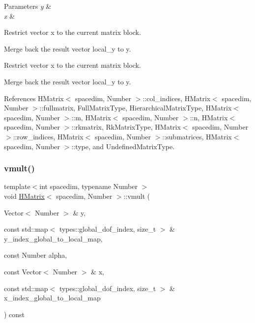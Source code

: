 \begin{DoxyParams}{Parameters}
{\em y} & \\
\hline
{\em x} & \\
\hline
\end{DoxyParams}
Restrict vector x to the current matrix block.

Merge back the result vector {\ttfamily local\+\_\+y} to {\ttfamily y}.

Restrict vector x to the current matrix block.

Merge back the result vector {\ttfamily local\+\_\+y} to {\ttfamily y}.

References H\+Matrix$<$ spacedim, Number $>$\+::col\+\_\+indices, H\+Matrix$<$ spacedim, Number $>$\+::fullmatrix, Full\+Matrix\+Type, Hierarchical\+Matrix\+Type, H\+Matrix$<$ spacedim, Number $>$\+::m, H\+Matrix$<$ spacedim, Number $>$\+::n, H\+Matrix$<$ spacedim, Number $>$\+::rkmatrix, Rk\+Matrix\+Type, H\+Matrix$<$ spacedim, Number $>$\+::row\+\_\+indices, H\+Matrix$<$ spacedim, Number $>$\+::submatrices, H\+Matrix$<$ spacedim, Number $>$\+::type, and Undefined\+Matrix\+Type.

\mbox{\label{classHMatrix_ab0a61c4d55a5d132b25589240be5c015}} 
\subsubsection{\texorpdfstring{vmult()}{vmult()}\hspace{0.1cm}{\footnotesize\ttfamily [4/4]}}
{\footnotesize\ttfamily template$<$int spacedim, typename Number $>$ \\
void \hyperlink{classHMatrix}{H\+Matrix}$<$ spacedim, Number $>$\+::vmult (\begin{DoxyParamCaption}\item[{Vector$<$ Number $>$ \&}]{y,  }\item[{const std\+::map$<$ types\+::global\+\_\+dof\+\_\+index, size\+\_\+t $>$ \&}]{y\+\_\+index\+\_\+global\+\_\+to\+\_\+local\+\_\+map,  }\item[{const Number}]{alpha,  }\item[{const Vector$<$ Number $>$ \&}]{x,  }\item[{const std\+::map$<$ types\+::global\+\_\+dof\+\_\+index, size\+\_\+t $>$ \&}]{x\+\_\+index\+\_\+global\+\_\+to\+\_\+local\+\_\+map }\end{DoxyParamCaption}) const}

